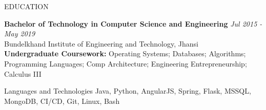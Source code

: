 \documentclass{resume} %
\begin{document}
\begin{rSection}{EDUCATION}

    {\bf Bachelor of Technology in Computer Science and Engineering} \hfill {\em Jul 2015 - May 2019} 
    \\ Bundelkhand Institute of Engineering and Technology, Jhansi
    \\ {\bf Undergraduate Coursework:} Operating Systems; Databases; Algorithms; Programming Languages; Comp Architecture; Engineering Entrepreneurship; Calculus III
    
    
    
    \end{rSection}

\begin{rSection}{Languages and Technologies}
Java, Python, AngularJS, Spring, Flask, MSSQL, MongoDB, CI/CD, Git, Linux, Bash \
\end{rSection}

\end{document}
